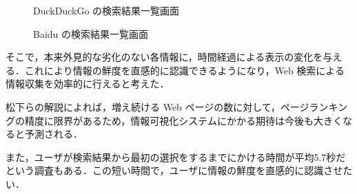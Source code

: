 \begin{figure}[htbp]
  \begin{minipage}{0.5\hsize}
    \begin{center}
    \end{center}
    \caption{DuckDuckGo の検索結果一覧画面}
  \end{minipage}
  \begin{minipage}{0.5\hsize}
    \begin{center}
    \end{center}
    \caption{Baidu の検索結果一覧画面}
  \end{minipage}
\end{figure}

そこで，本来外見的な劣化のない各情報に，時間経過による表示の変化を与える．これにより情報の鮮度を直感的に認識できるようになり，Web 検索による情報収集を効率的に行えると考えた．

松下らの解説によれば，増え続ける Web ページの数に対して，ページランキングの精度に限界があるため，情報可視化システムにかかる期待は今後も大きくなると予測される\cite{tecvisinfo}．

また，ユーザが検索結果から最初の選択をするまでにかける時間が平均5.7秒だという調査もある\cite{pinball}．この短い時間で，ユーザに情報の鮮度を直感的に認識させたい．

